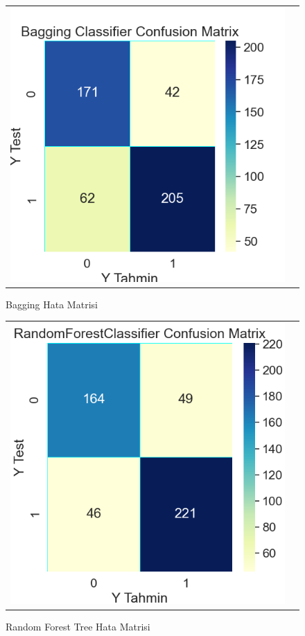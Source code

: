 \documentclass[conference]{IEEEtran}
\begin{document}
\begin{figure}[!h]
	\centering
	\begin{center}
		\begin{tabular}{cc}
			\includegraphics[scale=0.45]{pictures/pic_15.png}&
		\end{tabular}
	\end{center}
	\caption{Bagging Hata Matrisi}
	\label{fig:15}
\end{figure}
\pagebreak
\begin{figure}[!h]
	\centering
	\begin{center}
		\begin{tabular}{cc}
			\includegraphics[scale=0.45]{pictures/pic_16.png}&
		\end{tabular}
	\end{center}
	\caption{Random Forest Tree Hata Matrisi}
	\label{fig:16}
\end{figure}
\end{document}
